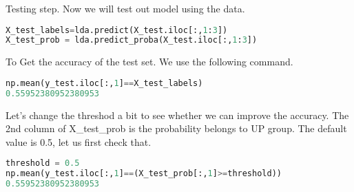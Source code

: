 Testing step. Now we will test out model using the data.
\begin{lstlisting}[language=Python]
X_test_labels=lda.predict(X_test.iloc[:,1:3])
X_test_prob = lda.predict_proba(X_test.iloc[:,1:3])
\end{lstlisting}

To Get the accuracy of the test set. We use the following command.

\begin{lstlisting}[language=Python]
np.mean(y_test.iloc[:,1]==X_test_labels)
0.55952380952380953
\end{lstlisting}

Let's change the threshod a bit to see whether we can improve the accuracy. The 2nd column of X\_test\_prob is the probability belongs to UP group. The default value is 0.5, let us first check that.

\begin{lstlisting}[language=Python]
threshold = 0.5 
np.mean(y_test.iloc[:,1]==(X_test_prob[:,1]>=threshold))
0.55952380952380953
\end{lstlisting}


